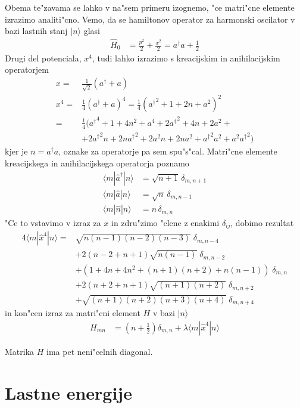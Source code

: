\documentclass[a4paper,10pt]{article}
\begin{document}
Obema te"zavama se lahko v na"sem primeru izognemo, "ce matri"cne elemente izrazimo analiti"cno. Vemo, da se hamiltonov operator za harmonski oscilator v bazi lastnih stanj $|n\rangle$ glasi
\begin{align}
  \hat H_0 &= \frac{p^2}{2} + \frac{x^2}{2} = a^\dagger a + \frac{1}{2}
\end{align}
Drugi del potenciala, $x^4$, tudi lahko izrazimo s kreacijskim in anihilacijskim operatorjem
\begin{align}
  x = & {} \frac{1}{\sqrt{2}} (a^\dagger + a) \\
  x^4 = & {} \frac{1}{4} (a^\dagger + a)^4 = \frac{1}{4} \left({a^\dagger}^2 + 1 + 2n + a^2\right)^2 \\
      = & {} \frac{1}{4} \Big( {a^\dagger}^4 + 1 + 4n^2 + a^4 + 2{a^\dagger}^2 + 4n + 2a^2 + \\
      &+ 2{a^\dagger}^2n + 2n{a^\dagger}^2 + 2{a}^2n + 2n{a}^2 + {a^\dagger}^2a^2 + a^2{a^\dagger}^2\Big)
\end{align}
kjer je $n=a^\dagger a$, oznake za operatorje pa sem spu"s"cal. Matri"cne elemente kreacijskega in anihilacijskega operatorja poznamo
\begin{align}
  \langle m|\hat a^\dagger|n\rangle &= \sqrt{n+1}\,\delta_{m,n+1}\\
  \langle m|\hat a|n\rangle &= \sqrt{n}\,\delta_{m,n-1} \\ 
  \langle m|\hat n|n\rangle &= n\,\delta_{m,n} 
\end{align}
"Ce to vstavimo v izraz za $x$ in zdru"zimo "clene z enakimi $\delta_{ij}$, dobimo rezultat
\begin{align}
  4\langle m|\hat x^4|n\rangle = & {} \sqrt{n(n-1)(n-2)(n-3)} \; \delta_{m,n-4} \\
  & + 2(n-2 + n + 1)\sqrt{n(n-1)} \; \delta_{m,n-2} \\
  & + (1 + 4n + 4n^2 + (n+1)(n+2) + n(n-1)) \; \delta_{m,n} \\
  & + 2(n+2 + n + 1)\sqrt{(n+1)(n+2)} \; \delta_{m,n+2} \\
  & + \sqrt{(n+1)(n+2)(n+3)(n+4)} \; \delta_{m,n+4}
\end{align}
in kon"cen izraz za matri"cni element $H$ v bazi $|n\rangle$
\begin{align}
  H_{mn} &= \left(n+\frac{1}{2}\right) \delta_{m,n} + \lambda\langle m|\hat x^4|n\rangle
\end{align}

Matrika $H$ ima pet neni"celnih diagonal. 

\section{Lastne energije}
\end{document}
